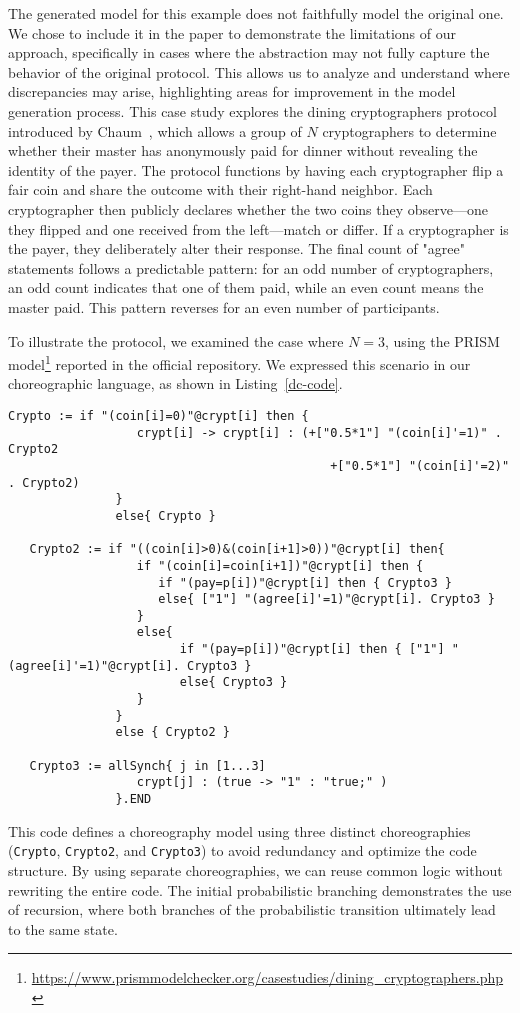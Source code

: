 The generated model for this example does not faithfully model the original one. We chose 
to include it in the paper to demonstrate the limitations of our approach, 
specifically in cases where the abstraction may not fully capture the behavior of the original protocol. 
This allows us to analyze and understand where discrepancies may arise, 
highlighting areas for improvement in the model generation process.
This case study explores the dining cryptographers protocol introduced by Chaum~\cite{Cha88}, which allows a group of $N$ cryptographers to determine whether their master has anonymously paid for dinner without revealing the identity of the payer. The protocol functions by having each cryptographer flip a fair coin and share the outcome with their right-hand neighbor. Each cryptographer then publicly declares whether the two coins they observe—one they flipped and one received from the left—match or differ. If a cryptographer is the payer, they deliberately alter their response. The final count of "agree" statements follows a predictable pattern: for an odd number of cryptographers, an odd count indicates that one of them paid, while an even count means the master paid. This pattern reverses for an even number of participants.

To illustrate the protocol, we examined the case where $N=3$, using the PRISM model\footnote{\url{https://www.prismmodelchecker.org/casestudies/dining_cryptographers.php}} reported in the official repository. We expressed this scenario in our choreographic language, as shown in Listing~\ref{dc-code}.
\begin{lstlisting}[style=chor-color,caption={Choreography for the Dining Cryptographers Protocol.},captionpos=b,label={dc-code}]
   Crypto := if "(coin[i]=0)"@crypt[i] then {
                  crypt[i] -> crypt[i] : (+["0.5*1"] "(coin[i]'=1)" . Crypto2
                                             +["0.5*1"] "(coin[i]'=2)" . Crypto2) 
               }
               else{ Crypto }

   Crypto2 := if "((coin[i]>0)&(coin[i+1]>0))"@crypt[i] then{
                  if "(coin[i]=coin[i+1])"@crypt[i] then {
                     if "(pay=p[i])"@crypt[i] then { Crypto3 }
                     else{ ["1"] "(agree[i]'=1)"@crypt[i]. Crypto3 }
                  }
                  else{
                        if "(pay=p[i])"@crypt[i] then { ["1"] "(agree[i]'=1)"@crypt[i]. Crypto3 }
                        else{ Crypto3 }
                  }
               }
               else { Crypto2 }

   Crypto3 := allSynch{ j in [1...3]
                  crypt[j] : (true -> "1" : "true;" )
               }.END
\end{lstlisting}
This code defines a choreography model using three distinct choreographies (\texttt{Crypto}, \texttt{Crypto2}, and \texttt{Crypto3}) to avoid redundancy and optimize the code structure. By using separate choreographies, we can reuse common logic without rewriting the entire code.
The initial probabilistic branching demonstrates the use of recursion, where both branches of the probabilistic transition ultimately lead to the same state. 

